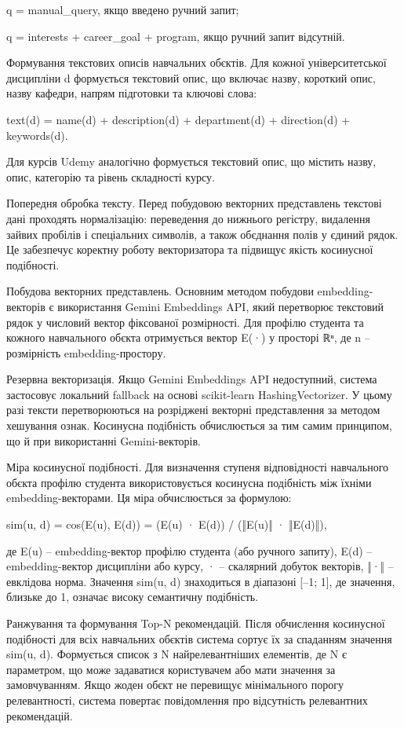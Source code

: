 \documentclass[
]{article}
\begin{document}
q = manual\_query, якщо введено ручний запит;

q = interests + career\_goal + program, якщо ручний запит відсутній.

Формування текстових описів навчальних об\textquotesingle єктів. Для
кожної університетської дисципліни d формується текстовий опис, що
включає назву, короткий опис, назву кафедри, напрям підготовки та
ключові слова:

text(d) = name(d) + description(d) + department(d) + direction(d) +
keywords(d).

Для курсів Udemy аналогічно формується текстовий опис, що містить назву,
опис, категорію та рівень складності курсу.

Попередня обробка тексту. Перед побудовою векторних представлень
текстові дані проходять нормалізацію: переведення до нижнього регістру,
видалення зайвих пробілів і спеціальних символів, а також
об\textquotesingle єднання полів у єдиний рядок. Це забезпечує коректну
роботу векторизатора та підвищує якість косинусної подібності.

Побудова векторних представлень. Основним методом побудови
embedding-векторів є використання Gemini Embeddings API, який перетворює
текстовий рядок у числовий вектор фіксованої розмірності. Для профілю
студента та кожного навчального об\textquotesingle єкта отримується
вектор E(·) у просторі ℝⁿ, де n -- розмірність embedding-простору.

Резервна векторизація. Якщо Gemini Embeddings API недоступний, система
застосовує локальний fallback на основі scikit-learn HashingVectorizer.
У цьому разі тексти перетворюються на розріджені векторні представлення
за методом хешування ознак. Косинусна подібність обчислюється за тим
самим принципом, що й при використанні Gemini-векторів.

Міра косинусної подібності. Для визначення ступеня відповідності
навчального об\textquotesingle єкта профілю студента використовується
косинусна подібність між їхніми embedding-векторами. Ця міра
обчислюється за формулою:

sim(u, d) = cos(E(u), E(d)) = (E(u) · E(d)) / (‖E(u)‖ · ‖E(d)‖),

де E(u) -- embedding-вектор профілю студента (або ручного запиту), E(d)
-- embedding-вектор дисципліни або курсу, · -- скалярний добуток
векторів, ‖·‖ -- евклідова норма. Значення sim(u, d) знаходиться в
діапазоні {[}--1; 1{]}, де значення, близьке до 1, означає високу
семантичну подібність.

Ранжування та формування Top-N рекомендацій. Після обчислення косинусної
подібності для всіх навчальних об\textquotesingle єктів система сортує
їх за спаданням значення sim(u, d). Формується список з N
найрелевантніших елементів, де N є параметром, що може задаватися
користувачем або мати значення за замовчуванням. Якщо жоден
об\textquotesingle єкт не перевищує мінімального порогу релевантності,
система повертає повідомлення про відсутність релевантних рекомендацій.
\end{document}

